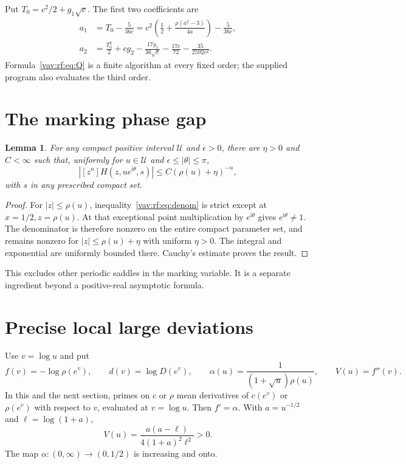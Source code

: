 \documentclass[11pt]{article}
\newtheorem{lemma}[theorem]{Lemma}
\theoremstyle{remark}\newtheorem{remark}[theorem]{Remark}
\newcommand{\ii}{\mathrm i}
\begin{document}
Put $T_0=c^2/2+g_1\sqrt c$. The first two coefficients are
\begin{align}
 a_1&=T_0-\frac5{36c}
 =c^2\left(\frac12+\frac{\rho(a^2-3)}{4a}\right)-\frac5{36c},\label{vav:rf:eq:a1}\\
 a_2&=\frac{T_0^2}{2}+cg_2-\frac{17g_1}{36\sqrt c}
                   -\frac{17c}{72}-\frac{35}{2592c^2}.\label{vav:rf:eq:a2}
\end{align}
Formula~\eqref{vav:rf:eq:Q} is a finite algorithm at every fixed order; the supplied program also evaluates the third order.

\section{The marking phase gap}\label{vav:rf:sec:gap}
\begin{lemma}\label{vav:rf:lem:gap}
For any compact positive interval $\mathcal U$ and $\epsilon>0$, there are $\eta>0$ and $C<\infty$ such that, uniformly for $u\in \mathcal U$ and $\epsilon\le|\theta|\le\pi$,
\begin{equation}\label{vav:rf:eq:gap}
 |[z^n]H(z,u e^{\ii\theta},s)|\le C(\rho(u)+\eta)^{-n},
\end{equation}
with $s$ in any prescribed compact set.
\end{lemma}
\begin{proof}
For $|z|\le\rho(u)$, inequality~\eqref{vav:rf:eq:denom} is strict except at $x=1/2,z=\rho(u)$. At that exceptional point multiplication by $e^{\ii\theta}$ gives $e^{\ii\theta}\ne1$. The denominator is therefore nonzero on the entire compact parameter set, and remains nonzero for $|z|\le\rho(u)+\eta$ with uniform $\eta>0$. The integral and exponential are uniformly bounded there. Cauchy's estimate proves the result.
\end{proof}
This excludes other periodic saddles in the marking variable. It is a separate ingredient beyond a positive-real asymptotic formula.

\section{Precise local large deviations}\label{vav:rf:sec:ldp}
Use $v=\log u$ and put
\[
 f(v)=-\log\rho(e^v),\qquad d(v)=\log D(e^v),\qquad
 \alpha(u)=\frac{1}{(1+\sqrt u)\rho(u)},\qquad V(u)=f''(v).
\]
In this and the next section, primes on $c$ or $\rho$ mean derivatives of $c(e^v)$ or $\rho(e^v)$ with respect to $v$, evaluated at $v=\log u$. Then $f'=\alpha$. With $a=u^{-1/2}$ and $\ell=\log(1+a)$,
\begin{equation}\label{vav:rf:eq:V}
 V(u)=\frac{a(a-\ell)}{4(1+a)^2\ell^2}>0.
\end{equation}
The map $\alpha:(0,\infty)\to(0,1/2)$ is increasing and onto.
\end{document}
